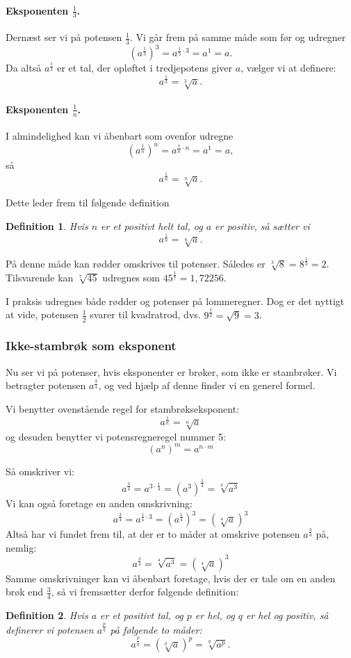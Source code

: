 \documentclass[12pt,oneside,a4paper]{article}
\theoremstyle{plain}
\newtheorem*{mydef}{Definition}
\begin{document}
\paragraph*{Eksponenten $\frac13$.}
Dernæst ser vi på potensen $\frac13$. Vi går frem på samme måde som før og
udregner
$$
\left(a^{\frac13}\right)^3 = a^{\frac13 \cdot 3} = a^1 = a.
$$
Da altså $a^\frac13$ er et tal, der opløftet i tredjepotens giver $a$, vælger
vi at definere:
$$
a^\frac13 = \sqrt[3]{a}.
$$

\paragraph*{Eksponenten $\frac1n$.}
I almindelighed kan vi åbenbart som ovenfor udregne
$$
\left(a^{\frac1n}\right)^n = a^{\frac1n \cdot n} = a^1 = a,
$$
så
$$
a^\frac1n = \sqrt[n]{a}.
$$

Dette leder frem til følgende definition
\begin{mydef}
    Hvis $n$ er et positivt helt tal, og $a$ er positiv, så sætter vi
    $$
    a^\frac1n = \sqrt[n]{a}.
    $$
\end{mydef}

På denne måde kan rødder omskrives til potenser. Således er $\sqrt[3]{8} =
8^{\frac13} = 2$.  Tilsvarende kan $\sqrt[7]{45}$ udregnes som $45^\frac17 =
1,72256$.

I praksis udregnes både rødder og potenser på lommeregner. Dog er det nyttigt
at vide, potensen $\frac12$ svarer til kvadratrod, dvs. $9^\frac12 = \sqrt{9} =
3$.

\subsubsection*{Ikke-stambrøk som eksponent}
Nu ser vi på potenser, hvis eksponenter er brøker, som ikke er stambrøker.
Vi betragter potensen $a^{\frac34}$, og ved hjælp af denne finder vi en generel
formel.

Vi benytter ovenstående regel for stambrøkseksponent:
$$
a^\frac1n = \sqrt[n]{a}
$$
og desuden benytter vi potensregneregel nummer 5:
$$
\left(a^n\right)^m = a^{n\cdot m}
$$

Så omskriver vi:
$$
a^{\frac34} = a^{3\cdot \frac14} = \left(a^3\right)^\frac14 = \sqrt[4]{a^3}
$$
Vi kan også foretage en anden omskrivning:
$$
a^{\frac34} = a^{\frac14 \cdot 3} = \left(a^\frac14\right)^3 =
\left(\sqrt[4]{a}\right)^3
$$
Altså har vi fundet frem til, at der er to måder at omskrive potensen $a^\frac34$ på, nemlig:
$$
a^\frac34 = \sqrt[4]{a^3} = \left(\sqrt[4]{a}\right)^3
$$
Samme omskrivninger kan vi åbenbart foretage, hvis der er tale om en anden brøk
end $\frac34$, så vi fremsætter derfor følgende definition:
\begin{mydef}
    Hvis $a$ er et positivt tal, og $p$ er hel, og $q$ er hel og positiv, så
    definerer vi potensen $a^\frac{p}{q}$ på følgende to måder:
    $$
    a^\frac{p}{q} = \left(\sqrt[q]{a}\right)^p = \sqrt[q]{a^p}.
    $$
\end{mydef}
\end{document}
